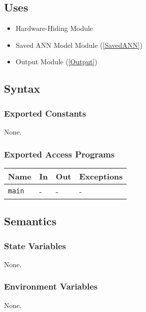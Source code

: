 \documentclass[12pt, titlepage]{article}
\def\code#1{\texttt{#1}}
\begin{document}

\subsection{Uses}
\begin{itemize}
  \item Hardware-Hiding Module  
  \item Saved ANN Model Module (\ref{SavedANN})
  \item Output Module (\ref{Output})
\end{itemize}


\subsection{Syntax}

\subsubsection{Exported Constants}
None.

\subsubsection{Exported Access Programs}

\begin{center}
\begin{tabular}{p{2cm} p{4cm} p{4cm} p{2cm}}
\hline
\textbf{Name} & \textbf{In} & \textbf{Out} & \textbf{Exceptions} \\
\hline
\code{main} & - & - & - \\
\hline
\end{tabular}
\end{center}

\subsection{Semantics}

\subsubsection{State Variables}
None.

\subsubsection{Environment Variables}
None.
\end{document}
